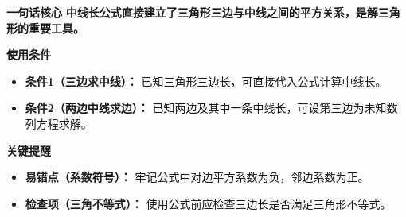 \begin{summarybox}
	\textbf{\textcolor{CSummary}{一句话核心}}
	\textbf{中线长公式直接建立了三角形三边与中线之间的平方关系，是解三角形的重要工具。}

	\medskip
	\textbf{\textcolor{CSummary}{使用条件}}
	\begin{itemize}[leftmargin=*, itemsep=0.5em, topsep=0.4em]
		\item \textbf{条件1（三边求中线）：} 已知三角形三边长，可直接代入公式计算中线长。
		\item \textbf{条件2（两边中线求边）：} 已知两边及其中一条中线长，可设第三边为未知数列方程求解。
	\end{itemize}

	\medskip
	\textbf{\textcolor{CSummary}{关键提醒}}
	\begin{itemize}[leftmargin=*, itemsep=0.5em, topsep=0.4em]
		\item \textbf{易错点（系数符号）：} 牢记公式中对边平方系数为负，邻边系数为正。
		\item \textbf{检查项（三角不等式）：} 使用公式前应检查三边长是否满足三角形不等式。
	\end{itemize}

\end{summarybox}
